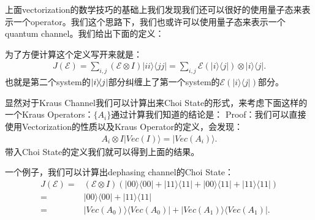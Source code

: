 \bigskip
{}


上面vectorization的数学技巧的基础上我们发现我们还可以很好的使用量子态来表示一个operator。我们这个思路下，我们也或许可以使用量子态来表示一个quantum channel。我们给出下面的定义：

为了方便计算这个定义写开来就是：
\begin{align}
  J(\mathcal{E})=\sum_{i,j}(\mathcal{E}\otimes I)|ii\rangle\langle jj|=\sum_{i,j}\mathcal{E}(|i\rangle\langle j|)\otimes|i\rangle\langle j|.
\end{align}
也就是第二个system的$ \left| i \middle\rangle\!\middle\langle j \right| $部分纠缠上了第一个system的$ \mathcal{E}(|i\rangle\langle j|) $部分。

\bigskip
{}

显然对于Kraus Channel我们可以计算出来Choi State的形式，来考虑下面这样的一个Kraus Operators：$ \{ A_i \} $通过计算我们知道的结论是：
Proof：我们可以直接使用Vectorization的性质以及Kraus Operator的定义，会发现：
\begin{align}
  A_i \otimes I |Vec(I)\rangle = |Vec(A_i)\rangle.
\end{align}
带入Choi State的定义我们就可以得到上面的结果。

一个例子，我们可以计算出dephasing channel的Choi State：
\begin{align}
  J(\mathcal{E})=&(\mathcal{E}\otimes I)(|00\rangle\langle00|+|11\rangle\langle11|+|00\rangle\langle11|+|11\rangle\langle11|)\\
  =&|00\rangle\langle00|+|11\rangle\langle11|\\ 
  =&|Vec(A_0)\rangle\langle Vec(A_0)| + |Vec(A_1)\rangle\langle Vec(A_1)|.
\end{align}


